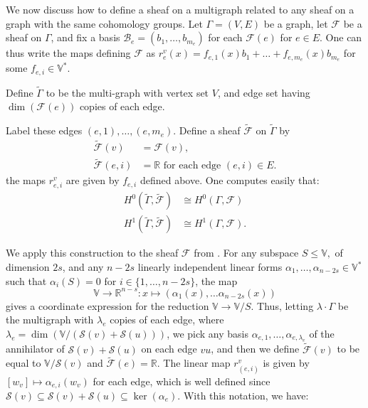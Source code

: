 \documentclass{article}
\theoremstyle{definition}
\theoremstyle{remark}
\begin{document}
We now discuss how to define a sheaf on a multigraph related to any sheaf on a graph with the same cohomology groups. Let $\Gamma=(V, E)$ be a graph, let $\mathcal{F}$ be a sheaf on $\Gamma$, and fix a basis $\mathcal{B}_e = (b_1, \dots, b_{m_e})$ for each $\mathcal{F}(e)$ for $e\in E$. One can thus write the maps defining $\mathcal{F}$ as $r^{v}_{e}(x) =f_{e, 1}(x)b_{1} + \dots + f_{e, m_e}(x)b_{m_e}$ for some $f_{e, i} \in \mathbb{V}^{*}$.

Define $\tilde{\Gamma}$ to be the multi-graph with vertex set $V$, and edge set having $\dim(\mathcal{F}(e))$ copies of each edge. 

Label these edges $(e, 1), \dots, (e, m_e)$. Define a sheaf $\tilde{\mathcal{F}}$ on $\tilde{\Gamma}$ by
\begin{align*}
    \tilde{\mathcal{F}}(v) &= \mathcal{F}(v),\\
    \tilde{\mathcal{F}}(e, i) &= \mathbb{R}  \text{ for each edge } (e, i) \in E.
\end{align*}
the maps $r^{v}_{e, i}$ are given by $f_{e, i}$ defined above. One computes easily that: 
\begin{align*}
    H^{0}(\tilde{\Gamma}, \tilde{\mathcal{F}}) &\cong  H^{0}(\Gamma, \mathcal{F})\\
    H^{1}(\tilde{\Gamma},\tilde{\mathcal{F}}) &\cong  H^{1}(\Gamma, \mathcal{F}).
\end{align*}

We apply this construction to the sheaf $\mathcal{F}$ from . For any subspace $S\leq \mathbb{V},$ of dimension $2s$, and any $n-2s$ linearly independent linear forms $\alpha_1, \dots, \alpha_{n-2s} \in \mathbb{V}^{*}$ such that $\alpha_{i}(S) = 0$ for $i\in \{1, \dots, n-2s\}$, the map
\begin{equation*}
\mathbb{V}\rightarrow \mathbb{R}^{n-s}: x \mapsto (\alpha_{1}(x), \dots \alpha_{n-2s}(x))
\end{equation*}
gives a coordinate expression for the reduction $\mathbb{V}\rightarrow \mathbb{V}/S$. Thus, letting $\lambda \cdot \Gamma$ be the multigraph with $\lambda_e$ copies of each edge, where $\lambda_e = \dim(\mathbb{V}/(\mathcal{S}(v) + \mathcal{S}(u)))$, we pick any basis $\alpha_{e,1}, \dots, \alpha_{e, \lambda_e}$ of the annihilator of $\mathcal{S}(v) + \mathcal{S}(u)$ on each edge $vu$, and then we define $\tilde{\mathcal{F}}(v)$ to be equal to $\mathbb{V}/\mathcal{S}(v)$ and $\tilde{\mathcal{F}}(e)=\mathbb{R}$. The linear map $r^{v}_{(e,i)}$ is given by $[w_{v}] \mapsto \alpha_{e, i}(w_v)$ for each edge, which is well defined since $\mathcal{S}(v) \subseteq \mathcal{S}(v) + \mathcal{S}(u)\subseteq \ker(\alpha_{e})$. With this notation, we have:
\end{document}
